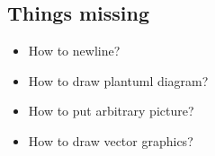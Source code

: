 \documentclass{beamer}
\begin{document}
\subsection{Things missing}

\begin{frame}
	\begin{itemize}
		\item How to newline?
		\item How to draw plantuml diagram?
		\item How to put arbitrary picture?
		\item How to draw vector graphics?
	\end{itemize}
\end{frame}
\end{document}
